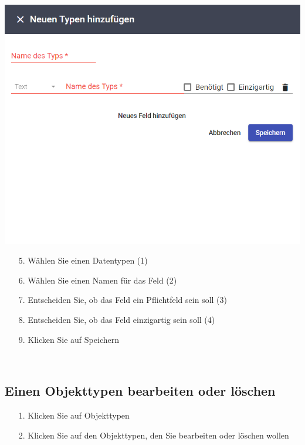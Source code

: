 \documentclass[11pt,a4paper]{report}
\begin{document}
	\begin{minipage}{0.5\linewidth}
	\includegraphics[width=\linewidth]{Objekttypadd.png}
	\end{minipage}
	\hfill
	\begin{minipage}{0.4\linewidth}
	\begin{itemize}
		\item[5.] Wählen Sie einen Datentypen (1)
		\item[6.] Wählen Sie einen Namen für das Feld (2)
		\item[7.] Entscheiden Sie, ob das Feld ein Pflichtfeld sein soll (3)
		\item[8.] Entscheiden Sie, ob das Feld einzigartig sein soll (4)
		\item[9.] Klicken Sie auf Speichern
	\end{itemize}
	\end{minipage}\\

	\subsection{Einen Objekttypen bearbeiten oder löschen}

	\begin{itemize}
		\item[1.] Klicken Sie auf \glqq{}Objekttypen\grqq{}
		\item[2.] Klicken Sie auf den Objekttypen, den Sie bearbeiten oder löschen wollen
	\end{itemize}
\end{document}
